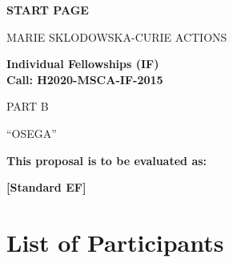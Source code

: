 \documentclass[a4paper,11pt]{article}
\newcommand{\acronym}{{\sc OSEGA}\xspace}
\begin{document}
\phantom{a}
\vspace{15mm}
\begin{center}


        \Large{
      
     
        \textbf{START PAGE}
  
          \vspace{15mm}
          MARIE SKLODOWSKA-CURIE ACTIONS\\
          \vspace{1cm}
          
          \textbf{Individual Fellowships (IF)}\\
          \textbf{Call: H2020-MSCA-IF-2015}
          \vspace{2cm}                   

          PART B
          \vspace{2.5cm}

          ``\acronym''
          \vspace{2cm}

          \textbf{This proposal is to be evaluated as:}
          \vspace{.5cm}

          \textbf{[Standard EF]}
        }

  \end{center}
\vspace{1cm}

\newpage
\setcounter{tocdepth}{1}
\setcounter{section}{-1}
\tableofcontents


\newpage
\section{List of Participants}
\label{sec:participants}

\newcommand\rotx[1]{\rotatebox[origin=c]{90}{\textbf{#1}}}
\newcommand\roty[1]{\rotatebox[origin=c]{90}{\parbox{4cm}{\raggedright\textbf{#1}}}}
\newcommand\MyHead[2]{\multicolumn{1}{l|}{\parbox{#1}{\centering #2}}}
\end{document}
